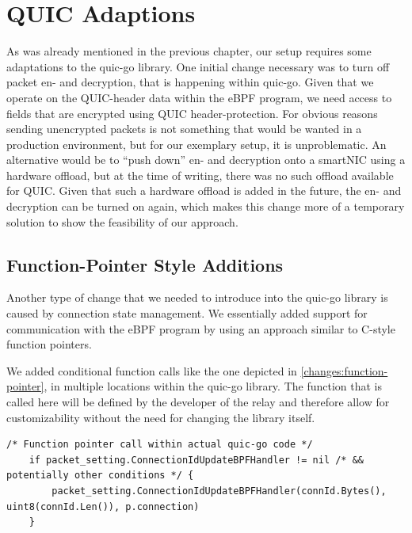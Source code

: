 \section{QUIC Adaptions}\label{sec:quic_adaptions}
As was already mentioned in the previous chapter, our setup requires some adaptations
to the quic-go library.
One initial change necessary was to turn off packet en- and decryption, 
that is happening within quic-go.
Given that we operate on the QUIC-header data within the eBPF program, we need access 
to fields that are encrypted using QUIC header-protection.
For obvious reasons sending unencrypted packets is not something that would be wanted in 
a production environment, but for our exemplary setup, it is unproblematic. 
An alternative would be to ``push down'' en- and decryption onto a smartNIC using a 
hardware offload, but at the time of writing, there was no such offload available for QUIC\@. 
Given that such a hardware offload is added in the future, the en- and decryption can be
turned on again, which makes this change more of a temporary solution to show the feasibility
of our approach.

\subsection{Function-Pointer Style Additions}
Another type of change that we needed to introduce into the quic-go library is caused by 
connection state management.
We essentially added support for communication with the eBPF program by using an 
approach similar to C-style function pointers.

We added conditional function calls like the one depicted in 
\autoref{changes:function-pointer}, in multiple locations 
within the quic-go library.
The function that is called here will be defined by the developer of the relay and 
therefore allow for customizability without the need for changing the library itself.

\vspace{0.5cm}
\noindent\begin{minipage}{\textwidth}
\begin{lstlisting}[style=GoStyle, label=changes:function-pointer, caption=An example of a function-pointer addition to the quic-go library.]
    /* Function pointer call within actual quic-go code */
    if packet_setting.ConnectionIdUpdateBPFHandler != nil /* && potentially other conditions */ {
	    packet_setting.ConnectionIdUpdateBPFHandler(connId.Bytes(), uint8(connId.Len()), p.connection)
	}
\end{lstlisting}
\end{minipage}

